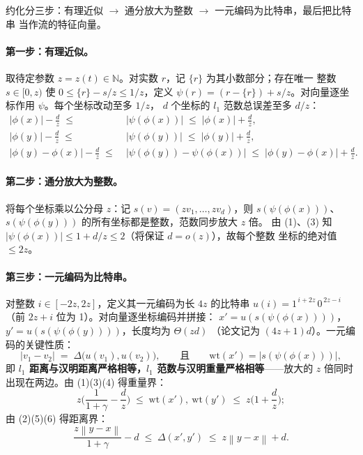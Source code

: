 \documentclass[UTF8, 11pt, a4paper, linestretch=1.15]{ctexart}
\theoremstyle{zhstyle}
\newcommand{\norm}[1]{\left\lVert #1 \right\rVert}
\begin{document}
	约化分三步：有理近似 $\to$ 通分放大为整数 $\to$ 一元编码为比特串，最后把比特串
	当作流的特征向量。
	
	\paragraph{第一步：有理近似。}
	取待定参数 $z = z(t) \in \mathbb{N}$。对实数 $r$，记 $\{r\}$ 为其小数部分；存在唯一
	整数 $s \in [0, z)$ 使 $0 \leq \{r\} - s/z \leq 1/z$，定义
	$\psi(r) = (r - \{r\}) + s/z$。对向量逐坐标作用 $\psi$。每个坐标改动至多 $1/z$，
	$d$ 个坐标的 $l_1$ 范数总误差至多 $d/z$：
	\begin{align}
		|\phi(x)| - \tfrac{d}{z} \;\leq\; &|\psi(\phi(x))| \;\leq\; |\phi(x)| + \tfrac{d}{z}, \tag{3}\\
		|\phi(y)| - \tfrac{d}{z} \;\leq\; &|\psi(\phi(y))| \;\leq\; |\phi(y)| + \tfrac{d}{z}, \tag{4}\\
		|\phi(y) - \phi(x)| - \tfrac{d}{z} \;\leq\; &|\psi(\phi(y)) - \psi(\phi(x))|
		\;\leq\; |\phi(y) - \phi(x)| + \tfrac{d}{z}. \tag{5,6}
	\end{align}
	
	\paragraph{第二步：通分放大为整数。}
	将每个坐标乘以公分母 $z$：记 $s(v) = (z v_1, \dots, z v_d)$，则
	$s(\psi(\phi(x)))$、$s(\psi(\phi(y)))$ 的所有坐标都是整数，范数同步放大 $z$ 倍。
	由 (1)、(3) 知 $|\psi(\phi(x))| \leq 1 + d/z \leq 2$（将保证 $d = o(z)$），故每个整数
	坐标的绝对值 $\leq 2z$。
	
	\paragraph{第三步：一元编码为比特串。}
	对整数 $i \in [-2z, 2z]$，定义其一元编码为长 $4z$ 的比特串
	$u(i) = 1^{\,i + 2z}\,0^{\,2z - i}$（前 $2z + i$ 位为 1）。对向量逐坐标编码并拼接：
	$x' = u(s(\psi(\phi(x))))$，$y' = u(s(\psi(\phi(y))))$，长度均为 $\Theta(zd)$
	（论文记为 $(4z+1)d$）。一元编码的关键性质：
	\[
	|v_1 - v_2| \;=\; \Delta\big(u(v_1), u(v_2)\big),
	\qquad\text{且}\qquad
	\mathrm{wt}(x') = |s(\psi(\phi(x)))|,
	\]
	即 \textbf{$l_1$ 距离与汉明距离严格相等，$l_1$ 范数与汉明重量严格相等}——放大的 $z$
	倍同时出现在两边。由 (1)(3)(4) 得重量界：
	\[
	z\Big(\frac{1}{1+\gamma} - \frac{d}{z}\Big) \;\leq\; \mathrm{wt}(x'),\ \mathrm{wt}(y')
	\;\leq\; z\Big(1 + \frac{d}{z}\Big);
	\]
	由 (2)(5)(6) 得距离界：
	\[
	\frac{z\norm{y-x}}{1+\gamma} - d \;\leq\; \Delta(x', y') \;\leq\; z\norm{y-x} + d. \tag{7}
	\]
	
\end{document}
